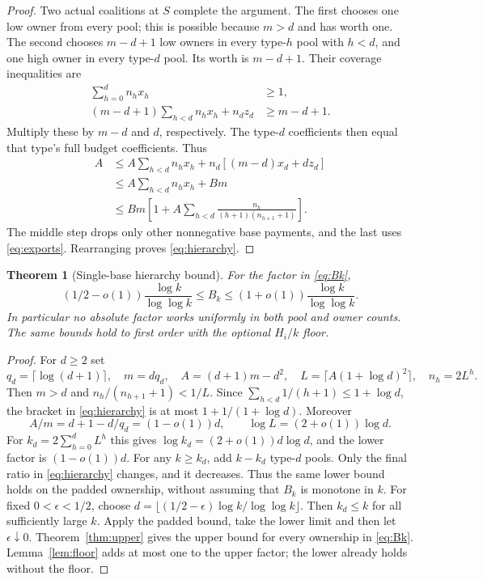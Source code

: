 \documentclass[11pt]{article}
\newtheorem{theorem}{Theorem}[section]
\theoremstyle{definition}\newtheorem{definition}[theorem]{Definition}
\theoremstyle{remark}\newtheorem{remark}[theorem]{Remark}
\begin{document}
\begin{proof}
Two actual coalitions at $S$ complete the argument. The first chooses one
low owner from every pool; this is possible because $m>d$ and has worth one.
The second chooses $m-d+1$ low owners in every type-$h$ pool with $h<d$,
and one high owner in every type-$d$ pool. Its worth is $m-d+1$.
Their coverage inequalities are
\begin{align}
 \sum_{h=0}^d n_hx_h&\ge1,\label{eq:hierarchy-c0}\\
 (m-d+1)\sum_{h<d}n_hx_h+n_dz_d&\ge m-d+1.
 \label{eq:hierarchy-c1}
\end{align}
Multiply these by $m-d$ and $d$, respectively. The type-$d$ coefficients
then equal that type's full budget coefficients. Thus
\begin{align*}
 A&\le A\sum_{h<d}n_hx_h+n_d[(m-d)x_d+dz_d]\\
  &\le A\sum_{h<d}n_hx_h+Bm\\
  &\le Bm\left[1+A\sum_{h<d}
            \frac{n_h}{(h+1)(n_{h+1}+1)}\right].
\end{align*}
The middle step drops only other nonnegative base payments, and the last
uses \eqref{eq:exports}. Rearranging proves \eqref{eq:hierarchy}.
\end{proof}

\begin{theorem}[Single-base hierarchy bound]\label{thm:half-order}
For the factor in \eqref{eq:Bk},
\[
 (1/2-o(1))\frac{\log k}{\log\log k}
 \le B_k\le(1+o(1))\frac{\log k}{\log\log k}.
\]
In particular no absolute factor works uniformly in both pool and owner
counts. The same bounds hold to first order with the optional $H_i/k$ floor.
\end{theorem}
\begin{proof}
For $d\ge2$ set
\[
 q_d=\lceil\log(d+1)\rceil,\quad m=dq_d,\quad
 A=(d+1)m-d^2,\quad L=\lceil A(1+\log d)^2\rceil,
 \quad n_h=2L^h.
\]
Then $m>d$ and $n_h/(n_{h+1}+1)<1/L$. Since
$\sum_{h<d}1/(h+1)\le1+\log d$, the bracket in
\eqref{eq:hierarchy} is at most $1+1/(1+\log d)$. Moreover
\[
 A/m=d+1-d/q_d=(1-o(1))d,\qquad
 \log L=(2+o(1))\log d.
\]
For $k_d=2\sum_{h=0}^d L^h$ this gives
$\log k_d=(2+o(1))d\log d$, and the lower factor is $(1-o(1))d$.
For any $k\ge k_d$, add $k-k_d$ type-$d$ pools. Only the final ratio in
\eqref{eq:hierarchy} changes, and it decreases. Thus the same lower bound
holds on the padded ownership, without assuming that $B_k$ is monotone in $k$.
For fixed $0<\epsilon<1/2$, choose
$d=\lfloor(1/2-\epsilon)\log k/\log\log k\rfloor$.
Then $k_d\le k$ for all sufficiently large $k$. Apply the padded bound,
take the lower limit and then let $\epsilon\downarrow0$.
Theorem~\ref{thm:upper} gives the upper bound for every ownership in
\eqref{eq:Bk}. Lemma~\ref{lem:floor} adds at most one to the upper factor;
the lower already holds without the floor.
\end{proof}
\end{document}
